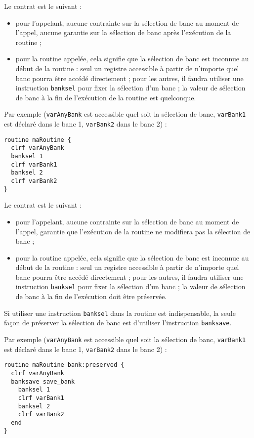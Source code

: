 
Le contrat est le suivant :
\begin{itemize}
\item pour l'appelant, aucune contrainte sur la sélection de banc au moment de l'appel, aucune garantie sur la sélection de banc après l'exécution de la routine ; 
\item pour la routine appelée, cela signifie que la sélection de banc est inconnue au début de la routine : seul un registre accessible à partir de n'importe quel banc pourra être accédé directement ; pour les autres, il faudra utiliser une instruction \texttt{banksel} pour fixer la sélection d'un banc ; la valeur de sélection de banc à la fin de l'exécution de la routine est quelconque.
\end{itemize}

Par exemple (\texttt{varAnyBank} est accessible quel soit la sélection de banc, \texttt{varBank1} est déclaré dans le banc 1, \texttt{varBank2} dans le banc 2) :
\begin{lstlisting}[language=piccolo]
routine maRoutine {
  clrf varAnyBank
  banksel 1
  clrf varBank1
  banksel 2
  clrf varBank2
}
\end{lstlisting}




Le contrat est le suivant :
\begin{itemize}
  \item pour l'appelant, aucune contrainte sur la sélection de banc au moment de l'appel, garantie que l'exécution de la routine ne modifiera pas la sélection de banc ; 
\item pour la routine appelée, cela signifie que la sélection de banc est inconnue au début de la routine : seul un registre accessible à partir de n'importe quel banc pourra être accédé directement ; pour les autres, il faudra utiliser une instruction \texttt{banksel} pour fixer la sélection d'un banc ; la valeur de sélection de banc à la fin de l'exécution doit être préservée.
\end{itemize}

Si utiliser une instruction \texttt{banksel} dans la routine est indispensable, la seule façon de préserver la sélection de banc est d'utiliser l'instruction \texttt{banksave}. 

Par exemple (\texttt{varAnyBank} est accessible quel soit la sélection de banc, \texttt{varBank1} est déclaré dans le banc 1, \texttt{varBank2} dans le banc 2) :
\begin{lstlisting}[language=piccolo]
routine maRoutine bank:preserved {
  clrf varAnyBank
  banksave save_bank
    banksel 1
    clrf varBank1
    banksel 2
    clrf varBank2
  end
}
\end{lstlisting}





